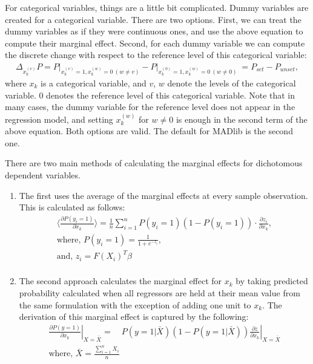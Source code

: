 For categorical variables, things are a little bit complicated. Dummy
variables are created for a categorical variable. There
are two options. First, we can treat the dummy variables as if they
were continuous ones, and use the above equation to compute their
marginal effect. Second, for each dummy variable we can compute the discrete change with
respect to the reference level of this categorical variable:
\begin{align*}
    \Delta_{x_k^{(v)}} P = \left.P\right\vert_{x_k^{(v)}=1, x_k^{(w)}=0\ (w\neq
    v)} - \left.P\right\vert_{x_k^{(0)}=1, x_k^{(w)}=0 \  (w \neq 0)}\ = P_{set} - P_{unset},
\end{align*}
where $x_k$ is a categorical variable, and $v$, $w$ denote the levels
of the categorical variable. $0$ denotes the reference level of this
categorical variable. Note that in many cases, the dummy variable for
the reference level does not appear in the regression model, and
setting $x_k^{(w)}$ for $w\neq 0$ is enough in the second term of the
above equation.
Both options are valid. The default for MADlib is the second one.

There are two main methods of calculating the marginal effects for dichotomous
dependent variables.
\begin{enumerate}
  \item The first uses the average of the marginal effects at every sample
  observation. This is calculated as follows:
  \begin{gather*}
    \langle \frac{\partial P(y_i = 1)}{\partial x_k} \rangle = \frac{1}{n}\sum_{i=1}^{n} P(y_i = 1)(1-P(y_i = 1))\cdot\frac{\partial z_i}{\partial x_k}, \\
    \text{where, } P(y_i=1) = \frac{1}{1 + e^{-z_i}}, \\
    \text{and, } z_i = F(X_i)^T\beta \\
  \end{gather*}

  \item The second approach calculates the marginal effect for $x_k$ by taking
    predicted probability calculated when all regressors are held at their mean
    value from the same formulation with the exception of adding one unit to $x_k$.
    The derivation of this marginal effect is captured by the following:
    \begin{gather*}
      \left.\frac{\partial P(y=1)}{\partial
          x_k}\right\vert_{X=\bar{X}} = \quad
      P(y=1|\bar{X})(1-P(y=1|\bar{X}))
      \left.\frac{\partial z}{\partial x_k}\right\vert_{X=\bar{X}} \\
      \text{where, } \bar{X} = \frac{\sum_{i=1}^{n}X_i}{n}
    \end{gather*}
\end{enumerate}

